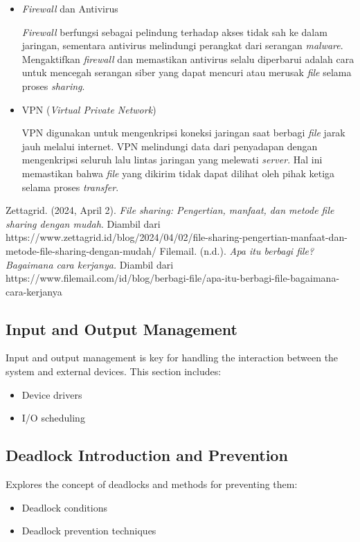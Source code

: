 \documentclass[12pt]{article}
\begin{document}
\begin{itemize}
\begin{itemize}
        \item \textit{Firewall} dan Antivirus

        \textit{Firewall} berfungsi sebagai pelindung terhadap akses tidak sah ke dalam jaringan, sementara antivirus melindungi perangkat dari serangan \textit{malware}. Mengaktifkan \textit{firewall} dan memastikan antivirus selalu diperbarui adalah cara untuk mencegah serangan siber yang dapat mencuri atau merusak \textit{file }selama proses \textit{sharing}.

        \item VPN (\textit{Virtual Private Network})

        VPN digunakan untuk mengenkripsi koneksi jaringan saat berbagi \textit{file }jarak jauh melalui internet. VPN melindungi data dari penyadapan dengan mengenkripsi seluruh lalu lintas jaringan yang melewati \textit{server}. Hal ini memastikan bahwa \textit{file} yang dikirim tidak dapat dilihat oleh pihak ketiga selama proses \textit{transfer}.
    \end{itemize}
\end{itemize}

\begin{thebibliography}{99}
        Zettagrid. (2024, April 2). \textit{File sharing: Pengertian, manfaat, dan metode file sharing dengan mudah}. Diambil dari https://www.zettagrid.id/blog/2024/04/02/file-sharing-pengertian-manfaat-dan-metode-file-sharing-dengan-mudah/
        Filemail. (n.d.). \textit{Apa itu berbagi file? Bagaimana cara kerjanya.} Diambil dari https://www.filemail.com/id/blog/berbagi-file/apa-itu-berbagi-file-bagaimana-cara-kerjanya
    \end{thebibliography}


\subsection{Input and Output Management}
Input and output management is key for handling the interaction between the system and external devices. This section includes:
\begin{itemize}
    \item Device drivers
    \item I/O scheduling
\end{itemize}

\subsection{Deadlock Introduction and Prevention}
Explores the concept of deadlocks and methods for preventing them:
\begin{itemize}
    \item Deadlock conditions
    \item Deadlock prevention techniques
\end{itemize}
\end{document}
